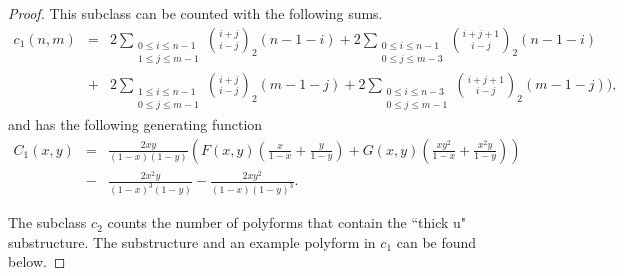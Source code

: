 \documentclass[12pt]{article}
\theoremstyle{plain}
\theoremstyle{definition}
\theoremstyle{remark}
\theoremstyle{definition}
\begin{document}
\begin{proof}
This subclass can be counted with the following sums.
\begin{eqnarray*}
c_1(n,m) & = & 2\sum_{\substack{0\leq i\leq n-1 \\ 1\leq j\leq m-1}} \binom{i+j}{i-j}_2(n-1-i) + 2\sum_{\substack{0\leq i\leq n-1 \\ 0\leq j\leq m-3}} \binom{i+j+1}{i-j}_2(n-1-i) \\
& + & {} 2\sum_{\substack{1\leq i\leq n-1 \\ 0\leq j\leq m-1}} \binom{i+j}{i-j}_2(m-1-j) + 2\sum_{\substack{0\leq i\leq n-3 \\ 0\leq j\leq m-1}} \binom{i+j+1}{i-j}_2(m-1-j)),
\end{eqnarray*}
and has the following generating function
\begin{eqnarray*}
    C_1(x,y) & = &  \frac{2xy}{(1-x)(1-y)}\left(F(x,y)\left(\frac{x}{1-x}+\frac{y}{1-y}\right)+G(x,y)\left(\frac{xy^2}{1-x}+\frac{x^2y}{1-y}\right)  \right) \\
    & - & \frac{2x^2y}{(1-x)^3(1-y)} - \frac{2xy^2}{(1-x)(1-y)^3}.
\end{eqnarray*}

The subclass $c_2$ counts the number of polyforms that contain the ``thick u" substructure. The substructure and an example polyform in $c_1$ can be found below. 


\end{proof}
\end{document}

